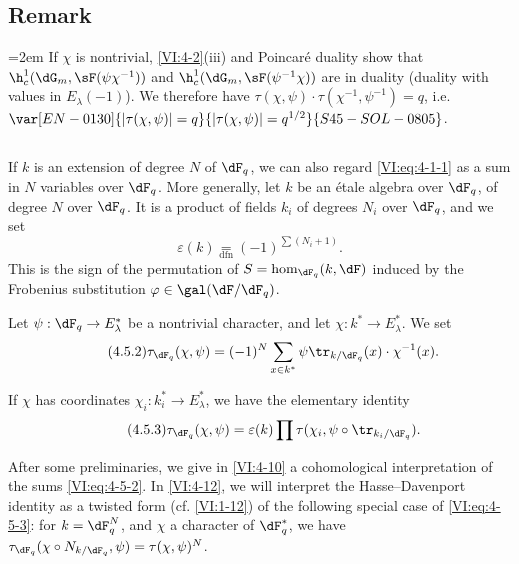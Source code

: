 \subsection{Remark}\label{VI:4-4}

\begingroup
\emergencystretch=2em\relax
If $\chi$ is nontrivial, \ref{VI:4-2}(iii) and Poincaré duality 
show that $\h_c^1(\dG_m,\sF(\psi\chi^{-1}))$ and 
$\h_c^1(\dG_m,\sF(\psi^{-1}\chi))$ are in duality (duality with values 
in $E_\lambda(-1)$). We therefore have 
$\tau(\chi,\psi)\cdot \tau(\chi^{-1},\psi^{-1}) = q$, i.e. 
$\var[EN-0130]{|\tau(\chi,\psi)|=q}{|\tau(\chi,\psi)|=q^{1/2}}{S45-SOL-0805}$.\par
\endgroup 





\subsection{}\label{VI:4-5}

If $k$ is an extension of degree $N$ of $\dF_q$, we can also regard 
\eqref{VI:eq:4-1-1} as a sum in $N$ variables over $\dF_q$. More 
generally, let $k$ be an étale algebra over $\dF_q$, of degree $N$ over 
$\dF_q$. It is a product of fields $k_i$ of degrees $N_i$ over $\dF_q$, and we set 
\begin{equation*}\tag{4.5.1}\label{VI:eq:4-5-1}
  \varepsilon(k) \underset{\mathrm{dfn}}{=} (-1)^{\sum (N_i+1)} \text{.} 
\end{equation*}
This is the sign of the permutation of $S=\hom_{\dF_q}(k,\dF)$ induced by the 
Frobenius substitution $\varphi\in \gal(\dF/\dF_q)$. 

Let $\psi:\dF_q\to E_\lambda^\ast$ be a nontrivial character, and let 
$\chi:k^\ast \to E_\lambda^\ast$. We set 
\begin{equation*}\tag{4.5.2}\label{VI:eq:4-5-2}
  \tau_{\dF_q}(\chi,\psi) = (-1)^N \sum_{x\in k^\ast} \psi \tr_{k/\dF_q}(x) \cdot \chi^{-1}(x) \text{.} 
\end{equation*}

If $\chi$ has coordinates $\chi_i:k_i^\ast \to E_\lambda^\ast$, we 
have the elementary identity 
\begin{equation*}\tag{4.5.3}\label{VI:eq:4-5-3}
  \tau_{\dF_q}(\chi,\psi) = \varepsilon(k) \prod \tau(\chi_i,\psi\circ \tr_{k_i/\dF_q}) \text{.}
\end{equation*}

After some preliminaries, we give in \ref{VI:4-10} a 
cohomological interpretation of the sums \eqref{VI:eq:4-5-2}. In 
\ref{VI:4-12}, we will interpret the Hasse--Davenport identity as a 
twisted form (cf. \ref{VI:1-12}) of the following special case of 
\eqref{VI:eq:4-5-3}: for $k=\dF_q^N$, and $\chi$ a character of 
$\dF_q^\ast$, we have 
$\tau_{\dF_q}(\chi\circ N_{k/\dF_q},\psi)=\tau(\chi,\psi)^N$. 





